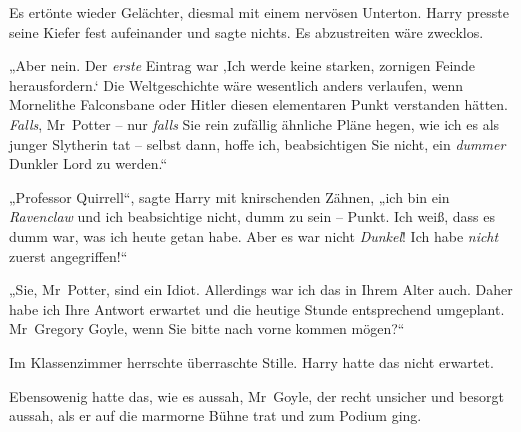 Es ertönte wieder Gelächter, diesmal mit einem nervösen Unterton. Harry presste seine Kiefer fest aufeinander und sagte nichts. Es abzustreiten wäre zwecklos.

„Aber nein. Der \emph{erste} Eintrag war ‚Ich werde keine starken, zornigen Feinde herausfordern.‘ Die Weltgeschichte wäre wesentlich anders verlaufen, wenn Mornelithe Falconsbane oder Hitler diesen elementaren Punkt verstanden hätten. \emph{Falls}, Mr~Potter – nur \emph{falls} Sie rein zufällig ähnliche Pläne hegen, wie ich es als junger Slytherin tat – selbst dann, hoffe ich, beabsichtigen Sie nicht, ein \emph{dummer} Dunkler Lord zu werden.“

„Professor Quirrell“, sagte Harry mit knirschenden Zähnen, „ich bin ein \emph{Ravenclaw} und ich beabsichtige nicht, dumm zu sein – Punkt. Ich weiß, dass es dumm war, was ich heute getan habe. Aber es war nicht \emph{Dunkel}! Ich habe \emph{nicht} zuerst angegriffen!“

„Sie, Mr~Potter, sind ein Idiot. Allerdings war ich das in Ihrem Alter auch. Daher habe ich Ihre Antwort erwartet und die heutige Stunde entsprechend umgeplant. Mr~Gregory Goyle, wenn Sie bitte nach vorne kommen mögen?“

Im Klassenzimmer herrschte überraschte Stille. Harry hatte das nicht erwartet.

Ebensowenig hatte das, wie es aussah, Mr~Goyle, der recht unsicher und besorgt aussah, als er auf die marmorne Bühne trat und zum Podium ging.


